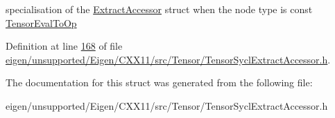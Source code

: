 specialisation of the \hyperlink{struct_eigen_1_1_tensor_sycl_1_1internal_1_1_extract_accessor}{Extract\+Accessor} struct when the node type is const \hyperlink{class_eigen_1_1_tensor_eval_to_op}{Tensor\+Eval\+To\+Op} 

Definition at line \hyperlink{eigen_2unsupported_2_eigen_2_c_x_x11_2src_2_tensor_2_tensor_sycl_extract_accessor_8h_source_l00168}{168} of file \hyperlink{eigen_2unsupported_2_eigen_2_c_x_x11_2src_2_tensor_2_tensor_sycl_extract_accessor_8h_source}{eigen/unsupported/\+Eigen/\+C\+X\+X11/src/\+Tensor/\+Tensor\+Sycl\+Extract\+Accessor.\+h}.



The documentation for this struct was generated from the following file\+:\begin{DoxyCompactItemize}
\item 
eigen/unsupported/\+Eigen/\+C\+X\+X11/src/\+Tensor/\+Tensor\+Sycl\+Extract\+Accessor.\+h\end{DoxyCompactItemize}
